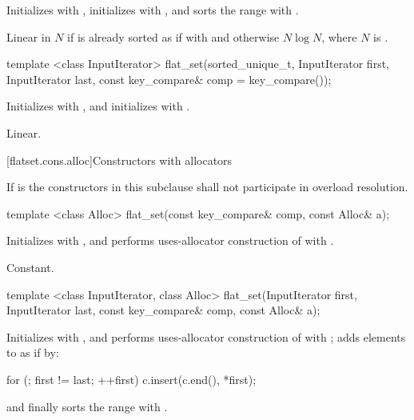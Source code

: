 \begin{codeblock}
\begin{codeblock}
\begin{codeblock}
\begin{addedblock}
\begin{itemdescr}
\pnum
\effects Initializes  with , initializes 
with , and sorts the range 
with .

\pnum
\complexity
Linear in $N$ if  is already sorted as if with  and
otherwise $N \log N$, where $N$ is .
\end{itemdescr}

%
\begin{itemdecl}
template <class InputIterator>
  flat_set(sorted_unique_t, InputIterator first, InputIterator last,
           const key_compare& comp = key_compare());
\end{itemdecl}

\begin{itemdescr}
\pnum
\effects Initializes  with , and initializes
 with .

\pnum
\complexity
Linear.
\end{itemdescr}

[flatset.cons.alloc]{Constructors with allocators}

\pnum
If  is 
the constructors in this subclause shall not participate in overload resolution.

%
\begin{itemdecl}
template <class Alloc>
  flat_set(const key_compare& comp, const Alloc& a);
\end{itemdecl}

\begin{itemdescr}
\pnum
\effects Initializes  with , and performs
uses-allocator construction of
 with .

\pnum
\complexity
Constant.
\end{itemdescr}

%
\begin{itemdecl}
template <class InputIterator, class Alloc>
  flat_set(InputIterator first, InputIterator last,
           const key_compare& comp, const Alloc& a);
\end{itemdecl}

\begin{itemdescr}
\pnum
\effects Initializes  with , and performs
uses-allocator construction of 
with ; adds elements to  as if by:
\begin{codeblock}
for (; first != last; ++first) {
  c.insert(c.end(), *first);
}
\end{codeblock}
and finally sorts the range  with .


\end{itemdescr}
\end{addedblock}
\end{codeblock}
\end{codeblock}
\end{codeblock}
